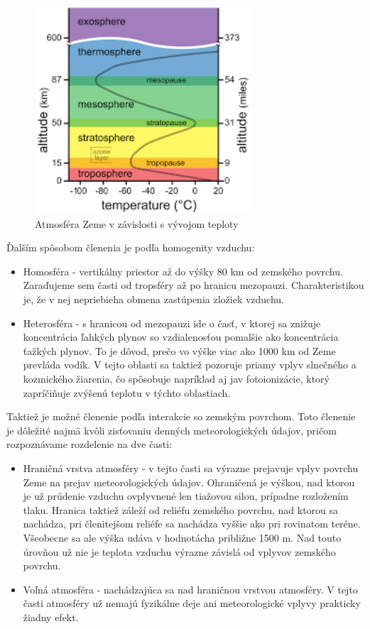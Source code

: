 \begin{figure}[!htbp]
  \centering
  \includegraphics[width=8cm]{img/atmosphere.png}
  \caption{Atmosféra Zeme v závislosti s vývojom teploty}
  \label{numModel}
\end{figure}

Ďalším spôsobom členenia je podľa homogenity vzduchu: 
\begin{itemize}
  \item Homosféra - vertikálny priestor až do výšky 80 km od zemského povrchu. Zaraďujeme sem časti od tropsféry až po hranicu mezopauzi. Charakteristikou je, že v nej nepriebieha obmena zastúpenia zložiek vzduchu.
  \item Heterosféra - s hranicou od mezopauzi ide o časť, v ktorej sa znižuje koncentrácia ľahkých plynov so vzdialenosťou pomalšie ako koncentrácia ťažkých plynov. To je dôvod, prečo vo výške viac ako 1000 km od Zeme prevláda vodík. V tejto oblasti sa taktiež pozoruje priamy vplyv slnečného a kozmického žiarenia, čo spôsobuje napríklad aj jav fotoionizácie, ktorý zapríčiňuje zvýšenú teplotu v týchto oblastiach.
\end{itemize}

Taktiež je možné členenie podľa interakcie so zemským povrchom. Toto členenie je dôležité najmä kvôli zisťovaniu denných meteorologických údajov, pričom rozpoznávame rozdelenie na dve časti:

\begin{itemize}
  \item Hraničná vrstva atmosféry - v tejto časti sa výrazne prejavuje vplyv povrchu Zeme na prejav meteorologických údajov. Ohraničená je výškou, nad ktorou je už prúdenie vzduchu ovplyvnené len tiažovou silou, prípadne rozložením tlaku. Hranica taktiež záleží od reliéfu zemského povrchu, nad ktorou sa nachádza, pri členitejšom reliéfe sa nachádza vyššie ako pri rovinatom teréne. Všeobecne sa ale výška udáva v hodnotácha približne 1500 m. Nad touto úrovňou už nie je teplota vzduchu výrazne závislá od vplyvov zemského povrchu.
  \item Voľná atmosféra - nachádzajúca sa nad hraničnou vrstvou atmosféry. V tejto časti atmosféry už nemajú fyzikálne deje ani meteorologické vplyvy prakticky žiadny efekt.
\end{itemize}

